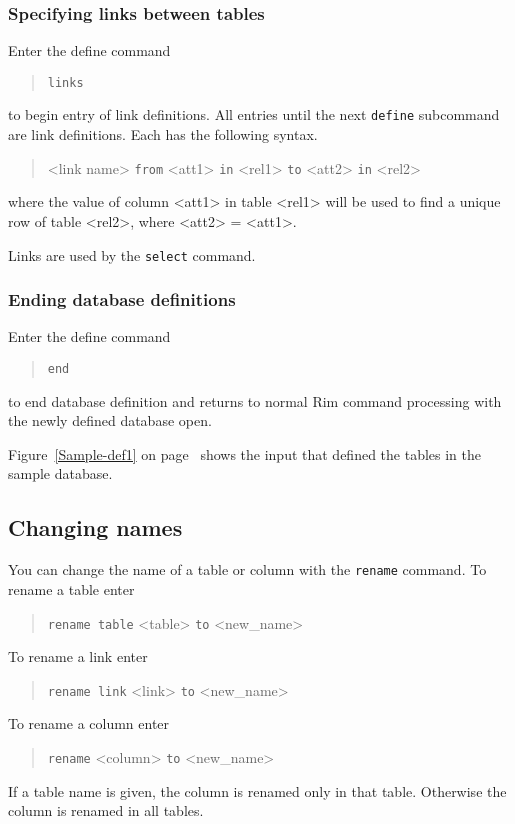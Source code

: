 \documentclass[11pt,a4paper]{report}
\begin{document}
\subsubsection{Specifying links between tables}
%
Enter the define command
\begin{verse}
\verb|links|
\end{verse}
to begin entry of link definitions.
All entries until the next \verb!define! subcommand
are link definitions.
Each has the following syntax.
\begin{verse}
<link name> \verb!from! <att1> \verb!in! <rel1> \verb!to! <att2> \verb!in! <rel2>
\end{verse}
where the value of column <att1> in table <rel1>
will be used to find a unique row of table <rel2>,
where <att2> = <att1>.
 
 
Links are used by the \verb!select! command.
 
 
\subsubsection{Ending database definitions}
%
Enter the define command
\begin{verse}
\verb|end| 
\end{verse}
to end database definition and returns to normal Rim command
processing with the newly defined database open.
 
Figure~\ref{Sample-def1}  on page~\pageref{Sample-def1} shows the input that
defined the tables in the sample database.
 
 
\subsection{Changing names}
You can change the name of a table or column with the \verb|rename| command.
To rename a table
enter
\begin{verse}
\verb|rename table| <table> \verb!to! <new\_name>
\end{verse}
To rename a link
enter
\begin{verse}
\verb|rename link| <link> \verb!to! <new\_name>
\end{verse}
To rename a column
enter
\begin{verse}
\verb|rename|  <column> \verb!to! <new\_name> 
\end{verse}
If a table name is given, the
column is renamed only in that table. Otherwise the column is
renamed in all tables.
 
\end{document}
